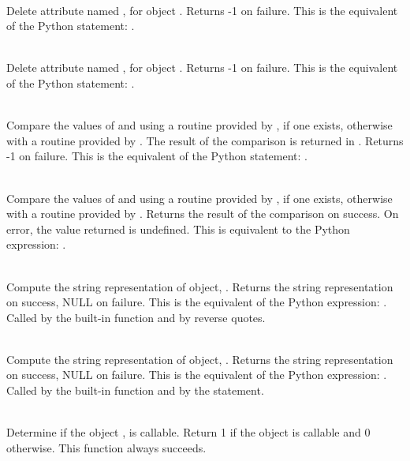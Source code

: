      \\
	 Delete attribute named , for object . Returns -1 on
	 failure.  This is the equivalent of the Python
	 statement: .


     \\
	 Delete attribute named , for object . Returns -1 on
	 failure.  This is the equivalent of the Python
	 statement: .


     \\
	 Compare the values of  and  using a routine provided by
	 , if one exists, otherwise with a routine provided by .
	 The result of the comparison is returned in .  Returns
	 -1 on failure.  This is the equivalent of the Python
	 statement: .


     \\
	 Compare the values of  and  using a routine provided by
	 , if one exists, otherwise with a routine provided by .
	 Returns the result of the comparison on success.  On error,
	 the value returned is undefined. This is equivalent to the
	 Python expression: .


     \\
	 Compute the string representation of object, .  Returns the
	 string representation on success, NULL on failure.  This is
	 the equivalent of the Python expression: .
	 Called by the  built-in function and by reverse quotes.


     \\
	 Compute the string representation of object, .  Returns the
	 string representation on success, NULL on failure.  This is
	 the equivalent of the Python expression: .
	 Called by the  built-in function and by the 
	 statement.


     \\
	 Determine if the object , is callable.  Return 1 if the
	 object is callable and 0 otherwise.
	 This function always succeeds.


